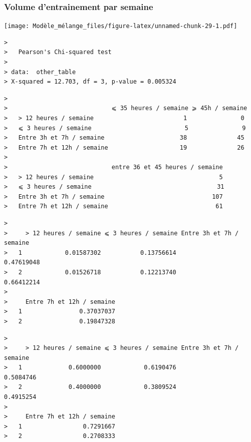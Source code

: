 \documentclass[
]{article}
\let\origfigure\figure
\let\endorigfigure\endfigure
\renewenvironment{figure}[1][2]{
    \expandafter\origfigure\expandafter[H]
} {
    \endorigfigure
}
\begin{document}
\hypertarget{volume-dentrainement-par-semaine}{%
\subsubsection{Volume d'entrainement par
semaine}\label{volume-dentrainement-par-semaine}}

\begin{figure}
\centering
\texttt{[image: Modèle\_mélange\_files/figure-latex/unnamed-chunk-29-1.pdf]}
\caption{Volume d'entrainement}
\end{figure}

\begin{verbatim}
> 
>   Pearson's Chi-squared test
> 
> data:  other_table
> X-squared = 12.703, df = 3, p-value = 0.005324
\end{verbatim}

\begin{verbatim}
>                            
>                             ⩽ 35 heures / semaine ⩾ 45h / semaine
>   > 12 heures / semaine                         1               0
>   ⩽ 3 heures / semaine                          5               9
>   Entre 3h et 7h / semaine                     38              45
>   Entre 7h et 12h / semaine                    19              26
>                            
>                             entre 36 et 45 heures / semaine
>   > 12 heures / semaine                                   5
>   ⩽ 3 heures / semaine                                   31
>   Entre 3h et 7h / semaine                              107
>   Entre 7h et 12h / semaine                              61
\end{verbatim}

\begin{verbatim}
>    
>     > 12 heures / semaine ⩽ 3 heures / semaine Entre 3h et 7h / semaine
>   1            0.01587302           0.13756614               0.47619048
>   2            0.01526718           0.12213740               0.66412214
>    
>     Entre 7h et 12h / semaine
>   1                0.37037037
>   2                0.19847328
\end{verbatim}

\begin{verbatim}
>    
>     > 12 heures / semaine ⩽ 3 heures / semaine Entre 3h et 7h / semaine
>   1             0.6000000            0.6190476                0.5084746
>   2             0.4000000            0.3809524                0.4915254
>    
>     Entre 7h et 12h / semaine
>   1                 0.7291667
>   2                 0.2708333
\end{verbatim}
\end{document}
